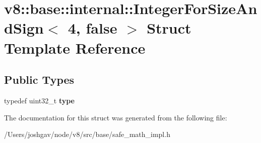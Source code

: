 \hypertarget{structv8_1_1base_1_1internal_1_1_integer_for_size_and_sign_3_014_00_01false_01_4}{}\section{v8\+:\+:base\+:\+:internal\+:\+:Integer\+For\+Size\+And\+Sign$<$ 4, false $>$ Struct Template Reference}
\label{structv8_1_1base_1_1internal_1_1_integer_for_size_and_sign_3_014_00_01false_01_4}
\subsection*{Public Types}
\begin{DoxyCompactItemize}
\item 
typedef uint32\+\_\+t {\bfseries type}\hypertarget{structv8_1_1base_1_1internal_1_1_integer_for_size_and_sign_3_014_00_01false_01_4_a624902243bda9245b6b41eae21c28367}{}\label{structv8_1_1base_1_1internal_1_1_integer_for_size_and_sign_3_014_00_01false_01_4_a624902243bda9245b6b41eae21c28367}

\end{DoxyCompactItemize}


The documentation for this struct was generated from the following file\+:\begin{DoxyCompactItemize}
\item 
/\+Users/joshgav/node/v8/src/base/safe\+\_\+math\+\_\+impl.\+h\end{DoxyCompactItemize}
